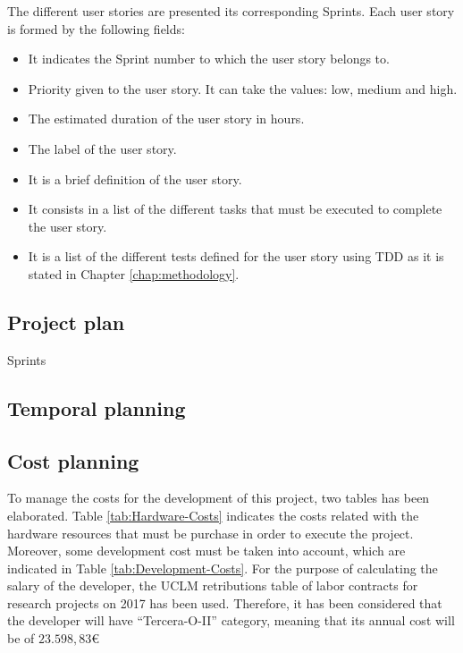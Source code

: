 The different user stories are presented its corresponding Sprints. Each user story is formed by the following fields:
\begin{itemize}
	\item {} It indicates the Sprint number to which the user story belongs to.
	\item {} Priority given to the user story. It can take the values: low, medium and high.
	\item {} The estimated duration of the user story in hours. 
	\item {} The label of the user story.
	\item {} It is a brief definition of the user story.
	\item {} It consists in a list of the different tasks that must be executed to complete the user story.
	\item {} It is a list of the different tests defined for the user story using \ac{TDD} as it is stated in Chapter \ref{chap:methodology}.
\end{itemize}

\subsection{Project plan}
\begin{table}[hp]
	\centering
	{\small
		
	}
	\caption{Sprints}
	\label{tab:Sprints}
\end{table}

\subsection{Temporal planning}





\subsection{Cost planning}
To manage the costs for the development of this project, two tables has been elaborated. Table \ref{tab:Hardware-Costs} indicates the costs related with the hardware resources that must be purchase in order to execute the project. Moreover, some development cost must be taken into account, which are indicated in Table \ref{tab:Development-Costs}. For the purpose of calculating the salary of the developer, the \ac{UCLM} retributions table of labor contracts for research projects on 2017 has been used. Therefore, it has been considered that the developer will have “Tercera-O-II” category, meaning that its annual cost will be of $23.598,83$\euro{}

